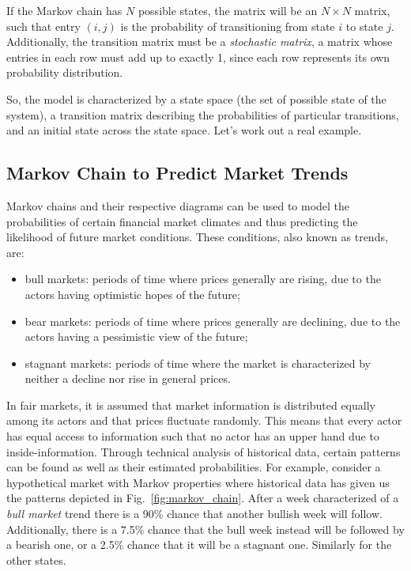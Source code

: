 If the Markov chain has $N$ possible states, the matrix will be an $N \times N$ matrix, such that entry $(i, j)$ is the probability of transitioning from state $i$ to state $j$. Additionally, the transition matrix must be a \emph{stochastic matrix}, a matrix whose entries in each row must add up to exactly 1, since each row represents its own probability distribution.

So, the model is characterized by a state space (the set of possible state of the system), a transition matrix describing the probabilities of particular transitions, and an initial state across the state space. Let's work out a real example. 

\subsection{Markov Chain to Predict Market Trends}
Markov chains and their respective diagrams can be used to model the probabilities of certain
financial market climates and thus predicting the likelihood of future market conditions.
These conditions, also known as trends, are:
\begin{itemize}
\item bull markets: periods of time where prices generally are rising, due to the actors
having optimistic hopes of the future;
\item bear markets: periods of time where prices generally are declining, due to the actors
having a pessimistic view of the future;
\item stagnant markets: periods of time where the market is characterized by neither a
decline nor rise in general prices.
\end{itemize}

In fair markets, it is assumed that market information is distributed equally among its actors and that prices fluctuate randomly. This means that every actor has equal access to information such that no actor has an upper hand due to inside-information. Through technical analysis of historical data, certain patterns can be found as well as their estimated probabilities. For example, consider a hypothetical market with Markov properties where historical data has given us the patterns depicted in Fig.~\ref{fig:markov_chain}.
After a week characterized of a \emph{bull market} trend there is a 90\% chance that another bullish week will follow. Additionally, there is a 7.5\% chance that the bull week instead will be followed by a bearish one, or a 2.5\% chance that it will be a stagnant one. Similarly for the other states. 


